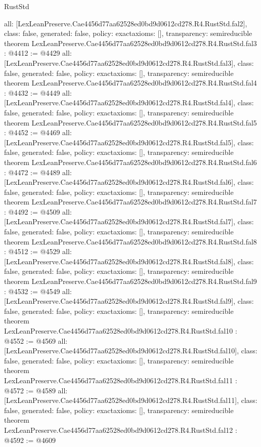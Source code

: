 \begin{lexlean}{RustStd}
\begin{coremodule}
{  all: [LexLeanPreserve.Cae4456d77aa62528ed0bd9d0612cd278.R4.RustStd.fal2],
  class: false,
  generated: false,
  policy: exact{axioms: []},
  transparency: semireducible
}
theorem LexLeanPreserve.Cae4456d77aa62528ed0bd9d0612cd278.R4.RustStd.fal3 : @4412 := @4429 {
  all: [LexLeanPreserve.Cae4456d77aa62528ed0bd9d0612cd278.R4.RustStd.fal3],
  class: false,
  generated: false,
  policy: exact{axioms: []},
  transparency: semireducible
}
theorem LexLeanPreserve.Cae4456d77aa62528ed0bd9d0612cd278.R4.RustStd.fal4 : @4432 := @4449 {
  all: [LexLeanPreserve.Cae4456d77aa62528ed0bd9d0612cd278.R4.RustStd.fal4],
  class: false,
  generated: false,
  policy: exact{axioms: []},
  transparency: semireducible
}
theorem LexLeanPreserve.Cae4456d77aa62528ed0bd9d0612cd278.R4.RustStd.fal5 : @4452 := @4469 {
  all: [LexLeanPreserve.Cae4456d77aa62528ed0bd9d0612cd278.R4.RustStd.fal5],
  class: false,
  generated: false,
  policy: exact{axioms: []},
  transparency: semireducible
}
theorem LexLeanPreserve.Cae4456d77aa62528ed0bd9d0612cd278.R4.RustStd.fal6 : @4472 := @4489 {
  all: [LexLeanPreserve.Cae4456d77aa62528ed0bd9d0612cd278.R4.RustStd.fal6],
  class: false,
  generated: false,
  policy: exact{axioms: []},
  transparency: semireducible
}
theorem LexLeanPreserve.Cae4456d77aa62528ed0bd9d0612cd278.R4.RustStd.fal7 : @4492 := @4509 {
  all: [LexLeanPreserve.Cae4456d77aa62528ed0bd9d0612cd278.R4.RustStd.fal7],
  class: false,
  generated: false,
  policy: exact{axioms: []},
  transparency: semireducible
}
theorem LexLeanPreserve.Cae4456d77aa62528ed0bd9d0612cd278.R4.RustStd.fal8 : @4512 := @4529 {
  all: [LexLeanPreserve.Cae4456d77aa62528ed0bd9d0612cd278.R4.RustStd.fal8],
  class: false,
  generated: false,
  policy: exact{axioms: []},
  transparency: semireducible
}
theorem LexLeanPreserve.Cae4456d77aa62528ed0bd9d0612cd278.R4.RustStd.fal9 : @4532 := @4549 {
  all: [LexLeanPreserve.Cae4456d77aa62528ed0bd9d0612cd278.R4.RustStd.fal9],
  class: false,
  generated: false,
  policy: exact{axioms: []},
  transparency: semireducible
}
theorem LexLeanPreserve.Cae4456d77aa62528ed0bd9d0612cd278.R4.RustStd.fal10 : @4552 := @4569 {
  all: [LexLeanPreserve.Cae4456d77aa62528ed0bd9d0612cd278.R4.RustStd.fal10],
  class: false,
  generated: false,
  policy: exact{axioms: []},
  transparency: semireducible
}
theorem LexLeanPreserve.Cae4456d77aa62528ed0bd9d0612cd278.R4.RustStd.fal11 : @4572 := @4589 {
  all: [LexLeanPreserve.Cae4456d77aa62528ed0bd9d0612cd278.R4.RustStd.fal11],
  class: false,
  generated: false,
  policy: exact{axioms: []},
  transparency: semireducible
}
theorem LexLeanPreserve.Cae4456d77aa62528ed0bd9d0612cd278.R4.RustStd.fal12 : @4592 := @4609 {
}
\end{coremodule}
\end{lexlean}
